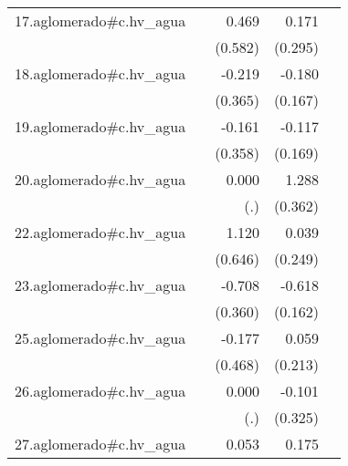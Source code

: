 {\begin{longtable}{l*{4}{D{.}{.}{-1}}}
\addlinespace
17.aglomerado#c.hv\_agua&                     &       0.469         &       0.171         &                     \\
            &                     &     (0.582)         &     (0.295)         &                     \\
\addlinespace
18.aglomerado#c.hv\_agua&                     &      -0.219         &      -0.180         &                     \\
            &                     &     (0.365)         &     (0.167)         &                     \\
\addlinespace
19.aglomerado#c.hv\_agua&                     &      -0.161         &      -0.117         &                     \\
            &                     &     (0.358)         &     (0.169)         &                     \\
\addlinespace
20.aglomerado#c.hv\_agua&                     &       0.000         &       1.288\sym{***}&                     \\
            &                     &         (.)         &     (0.362)         &                     \\
\addlinespace
22.aglomerado#c.hv\_agua&                     &       1.120         &       0.039         &                     \\
            &                     &     (0.646)         &     (0.249)         &                     \\
\addlinespace
23.aglomerado#c.hv\_agua&                     &      -0.708\sym{*}  &      -0.618\sym{***}&                     \\
            &                     &     (0.360)         &     (0.162)         &                     \\
\addlinespace
25.aglomerado#c.hv\_agua&                     &      -0.177         &       0.059         &                     \\
            &                     &     (0.468)         &     (0.213)         &                     \\
\addlinespace
26.aglomerado#c.hv\_agua&                     &       0.000         &      -0.101         &                     \\
            &                     &         (.)         &     (0.325)         &                     \\
\addlinespace
27.aglomerado#c.hv\_agua&                     &       0.053         &       0.175         &                     \\

\end{longtable}}
